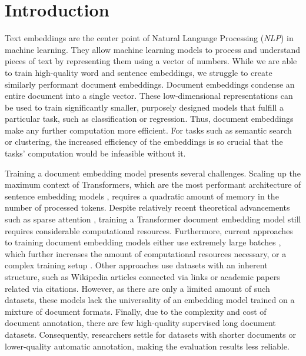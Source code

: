 \chapter*{Introduction}

Text embeddings are the center point of Natural Language Processing
(\emph{NLP}) in machine learning. They allow machine learning models to process
and understand pieces of text by representing them using a vector of numbers.
While we are able to train high-quality word and sentence embeddings, we
struggle to create similarly performant document embeddings. Document
embeddings condense an entire document into a single vector. These
low-dimensional representations can be used to train significantly smaller,
purposely designed models that fulfill a particular task, such as
classification or regression. Thus, document embeddings make any further
computation more efficient. For tasks such as semantic search or clustering,
the increased efficiency of the embeddings is so crucial that the tasks'
computation would be infeasible without it.

Training a document embedding model presents several challenges. Scaling up the
maximum context of Transformers, which are the most performant architecture of
sentence embedding models \citep{reimers2019sentence,gao2021simcse}, requires a
quadratic amount of memory in the number of processed tokens. Despite
relatively recent theoretical advancements such as sparse attention
\citep{child2019generating}, training a Transformer document embedding model
still requires considerable computational resources. Furthermore, current
approaches to training document embedding models either use extremely large
batches \citep{neelakantan2022text}, which further increases the amount of
computational resources necessary, or a complex training setup
\citep{izacard2021unsupervised}. Other approaches
\citep{ostendorff2022neighborhood, cohan2020specter} use datasets with an
inherent structure, such as Wikipedia articles connected via links or academic
papers related via citations. However, as there are only a limited amount of
such datasets, these models lack the universality of an embedding model trained
on a mixture of document formats. Finally, due to the complexity and cost of
document annotation, there are few high-quality supervised long document
datasets. Consequently, researchers settle for datasets with shorter documents
or lower-quality automatic annotation, making the evaluation results less
reliable.

